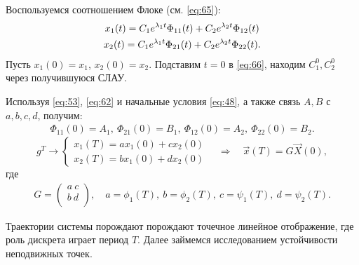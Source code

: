 Воспользуемся соотношением Флоке (см. \eqref{eq:65}):
\begin{gather}
	x_1(t)=C_1 e^{\lambda_1 t}\Phi_{11}(t)+C_2 e^{\lambda_2 t}\Phi_{12}(t) \notag \\ 
	x_2(t)=C_1 e^{\lambda_1 t}\Phi_{21}(t)+C_2 e^{\lambda_2 t}\Phi_{22}(t).	
	\label{eq:66}
\end{gather}
Пусть $x_1(0)=x_1$, $x_2(0)=x_2$. Подставим $t=0$ в \eqref{eq:66}, находим $C_1^0, C_2^0$ через получившуюся СЛАУ. 

Используя \eqref{eq:53}, \eqref{eq:62} и начальные условия \eqref{eq:48}, а также связь  $A,B$ с $a, b, c, d$, получим: 
\begin{gather}
	\Phi_{11}(0)=A_1,~\Phi_{21}(0)=B_1,~\Phi_{12}(0)=A_2,~\Phi_{22}(0)=B_2.	
\end{gather}
\begin{equation}
	g^T\rightarrow
	\left\{\begin{aligned}
		x_1(T)=a x_1(0)+c x_2(0) \\
		x_2(T)=b x_1(0)+d x_2(0)		
	\end{aligned}\right. \quad\Rightarrow\quad
	\vec{x}(T)=G \vec{X}(0),
	\label{eq:68}
\end{equation}
где
\begin{gather*}
	G=
	\begin{pmatrix}
		a ~c \\
		b ~d \\
	\end{pmatrix}
	,\quad
	a=\phi_1(T), ~ b=\phi_2(T), ~
	c=\psi_1(T), ~ d=\psi_2(T).
\end{gather*}

Траектории системы порождают порождают точечное линейное отображение, где роль дискрета играет период $T$. Далее займемся исследованием устойчивости неподвижных точек. 




